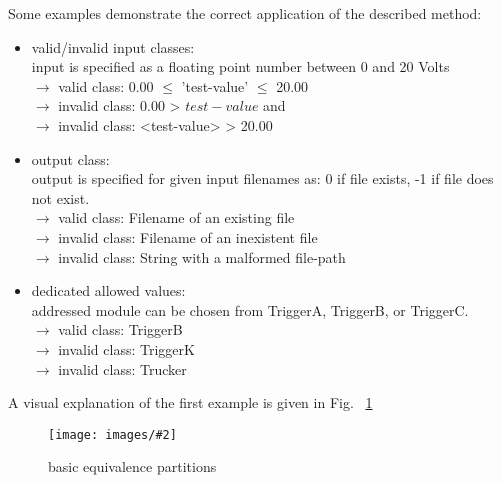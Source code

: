 \documentclass[master,english,smartquotes,apa]{hgbthesis}
\newcommand \bildGr[5]{\begin{figure}[#1]	\centering	\texttt{[image: images/\#2]}	\caption{#3}	\label{#4}	\end{figure}}
\begin{document}
	Some examples demonstrate the correct application of the described method:
	

	\begin{itemize}
		\item valid/invalid input classes: \\
			input is specified as a floating point number between 0 and 20 Volts \\
			$\rightarrow$ valid class: 0.00 $\le$ 'test-value' $\le$ 20.00 \\
			$\rightarrow$ invalid class: 0.00 > $test-value$ and \\
			$\rightarrow$ invalid class: <test-value> > 20.00 \\
		\item output class: \\
			output is specified for given input filenames as: 0 if file exists, -1 if file does not exist. \\
			$\rightarrow$ valid class: Filename of an existing file\\
			$\rightarrow$ invalid class:  Filename of an inexistent file\\
			$\rightarrow$ invalid class:  String with a malformed file-path \\
		\item dedicated allowed values: \\
			addressed module can be chosen from TriggerA, TriggerB, or TriggerC. \\
			$\rightarrow$ valid class: TriggerB \\
			$\rightarrow$ invalid class:  TriggerK \\
			$\rightarrow$ invalid class:  Trucker \\
	\end{itemize}

	A visual explanation of the first example is given in Fig. ~\ref{EquivPart01}
	\bildGr{h!}{EquivPart01}{basic equivalence partitions}{EquivPart01}{\textwidth}
	
\end{document}
